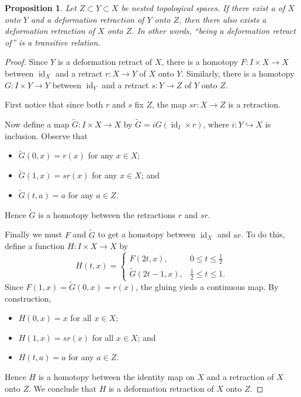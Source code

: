 \documentclass[12pt]{article}
\newtheorem*{proposition*}{Proposition}
\DeclareMathOperator{\id}{id}
\begin{document}
\begin{proposition*}
Let $Z\subset Y\subset X$ be nested topological spaces.  If there exist a 
 of $X$ onto $Y$ and a deformation retraction of $Y$ onto $Z$,
then there also exists a deformation retraction of $X$ onto $Z$.  In other words,
``being a deformation retract of'' is a transitive relation.
\end{proposition*}

\begin{proof}
Since $Y$ is a deformation retract of $X$, there is a homotopy 
$F:I\times X\to X$ between $\id_X$ and a retract $r:X\to Y$ of 
$X$ onto $Y$.  Similarly, there is a homotopy $G:I\times Y\to Y$
between $\id_Y$ and a retract $s:Y\to Z$ of $Y$ onto $Z$.

First notice that since both $r$ and $s$ fix $Z$, the map $sr:X\to Z$
is a retraction.

Now define a map $\widetilde{G}:I\times X\to X$ by 
$\widetilde{G}=iG(\id_I\times r)$, where $i:Y\hookrightarrow X$ is 
inclusion.  Observe that
\begin{itemize}
\item
$\widetilde{G}(0,x)=r(x)$ for any $x\in X$;
\item
$\widetilde{G}(1,x)=sr(x)$ for any $x\in X$; and
\item
$\widetilde{G}(t,a)=a$ for any $a\in Z$.
\end{itemize}
Hence $\widetilde{G}$ is a homotopy between the retractions $r$ and $sr$.

Finally we must 
 $F$ and $\widetilde{G}$ to get a 
homotopy between $\id_X$ and $sr$.  To do this, define a function
$H:I\times X\to X$ by
\[
H(t,x)=\begin{cases}
F(2t,x),                & 0\le t\le\frac{1}{2} \\
\widetilde{G}(2t-1, x), & \frac{1}{2}\le t\le 1.
\end{cases}
\]
Since $F(1,x)=\widetilde{G}(0,x)=r(x)$, the gluing yieds a continuous map.
By construction, 
\begin{itemize}
\item
$H(0,x)=x$ for all $x\in X$;
\item
$H(1,x)=sr(x)$ for all $x\in X$; and
\item
$H(t,a)=a$ for any $a\in Z$.
\end{itemize}
Hence $H$ is a homotopy between the identity map on $X$ and a retraction of $X$ onto $Z$.  We conclude that $H$ is a deformation retraction of $X$ onto $Z$.
\end{proof}
\end{document}
